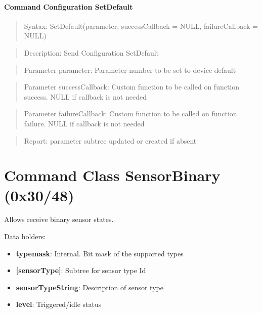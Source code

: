 \paragraph{Command Configuration SetDefault}
\begin{quote}Syntax: SetDefault(parameter, successCallback = NULL, failureCallback = NULL)\end{quote}
\begin{quote}Description: Send Configuration SetDefault\end{quote}
\begin{quote}Parameter parameter: Parameter number to be set to device default\end{quote}
\begin{quote}Parameter successCallback: Custom function to be called on function success. NULL if callback is not needed\end{quote}
\begin{quote}Parameter failureCallback: Custom function to be called on function failure. NULL if callback is not needed\end{quote}
\begin{quote}Report: parameter subtree updated or created if absent\end{quote}


\section{Command Class SensorBinary (0x30/48)}

Allows receive binary sensor states.
\newline

\noindent
Data holders:

\begin{itemize}
\item \textbf{typemask}: Internal. Bit mask of the supported types
\item \textbf{[sensorType]}: Subtree for sensor type Id
\item \qquad\textbf{sensorTypeString}: Description of sensor type
\item \qquad\textbf{level}: Triggered/idle status
\end{itemize}


